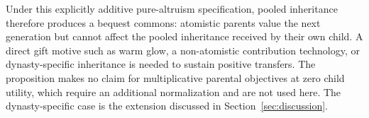 \documentclass[12pt,letterpaper]{article}
\theoremstyle{definition}
\begin{document}
Under this explicitly additive pure-altruism specification, pooled inheritance therefore produces a bequest commons: atomistic parents value the next generation but cannot affect the pooled inheritance received by their own child.
A direct gift motive such as warm glow, a non-atomistic contribution technology, or dynasty-specific inheritance is needed to sustain positive transfers.
The proposition makes no claim for multiplicative parental objectives at zero child utility, which require an additional normalization and are not used here.
The dynasty-specific case is the extension discussed in Section~\ref{sec:discussion}.



\end{document}
